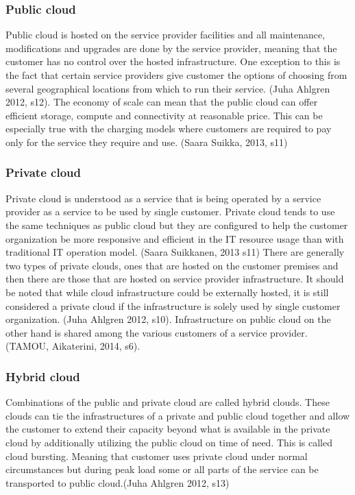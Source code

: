 \documentclass{article}
\begin{document}
\subsubsection{Public cloud}
Public cloud is hosted on the service provider facilities and all maintenance, modifications and upgrades are done by the service provider, meaning that the customer has no control over the hosted infrastructure. One exception to this is the fact that certain service providers give customer the options of choosing from several geographical locations from which to run their service. (Juha Ahlgren 2012, s12).
The economy of scale can mean that the public cloud can offer efficient storage, compute and connectivity at reasonable price. This can be especially true with the charging models where customers are required to pay only for the service they require and use. (Saara Suikka, 2013, s11)
\subsubsection{Private cloud}
Private cloud is understood as a service that is being operated by a service provider as a service to be used by single customer. Private cloud tends to use the same techniques as public cloud but they are configured to help the customer organization be more responsive and efficient in the IT resource usage than with traditional IT operation model. (Saara Suikkanen, 2013 s11)
There are generally two types of private clouds, ones that are hosted on the customer premises and then there are those that are hosted on service provider infrastructure. It should be noted that while cloud infrastructure could be externally hosted, it is still considered a private cloud if the infrastructure is solely used by single customer organization. (Juha Ahlgren 2012, s10).
Infrastructure on public cloud on the other hand is shared among the various customers of a service provider. (TAMOU, Aikaterini, 2014, s6).
\subsubsection{Hybrid cloud}
Combinations of the public and private cloud are called hybrid clouds. These clouds can tie the infrastructures of a private and public cloud together and allow the customer to extend their capacity beyond what is available in the private cloud by additionally utilizing the public cloud on time of need. This is called cloud bursting. Meaning that customer uses private cloud under normal circumstances but during peak load some or all parts of the service can be transported to public cloud.(Juha Ahlgren 2012, s13)
\end{document}
